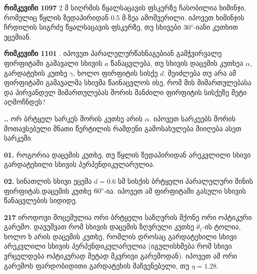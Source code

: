 \documentclass{book}
\begin{document}
\textbf{რიმკევიჩი 1097} 2 მ სიღრმის წყალსაცავის ფსკერზე ჩასობილია ხიმინჯი, რომელიც წყლის ზედაპირიდან 0.5 მ-ზეა ამოშვერილი. იპოვეთ ხიმინჯის ჩრდილის სიგრძე წყალსაცავის ფსკერზე, თუ სხივები $30 \degree$-იანი კუთხით ეცემიან.

\textbf{რიმკევიჩი 1101} . იპოვეთ პარალელურწახნაგებიან გამჭვირვალე ფირფიტაში გამავალი სხივის $a$ წანაცვლება, თუ სხივის დაცემის კუთხეა $\alpha$, გარდატეხის კუთხე $\gamma$, ხოლო ფირფიტის სისქე $d$. მეიძლება თუ არა ამ ფირფიტაში გამავალმა სხივმა წაინაცვლოს ისე, რომ მის მიმართულებასა და პირვანდელ მიმართულებას შორის მანძილი ფირფიტის სისქეზე მეტი აღმოჩნდეს?

\textbf{..} 
ორ ბრტყელ სარკეს შორის კუთხე არის $\alpha$. იპოვეთ სარკეებს შორის მოთავსებული მნათი წერტილის რამდენი გამოსახულება მიიღება ასეთ სარკეში.

\textbf{01.}
როგორია დაცემის კუთხე, თუ წყლის ზედაპირიდან არეკვლილი სხივი გარდატეხილი სხივის პერპენდიკულარულია.

\textbf{02.}
სინათლის სხივი ეცემა $d = 0.6$ სმ სისქის ბრტყელი პარალელური მინის ფირფიტას.დაცემის კუთხე $60 \degree$-ია. იპოვეთ ამ ფირფიტაში გასული სხივის წანაცვლების სიდიდე.

\textbf{217}
იროდოვი 
მოცემულია ორი ბრტყელი საზღვრის მქონე ორი ოპტიკური გარემო. დავუშვათ რომ სხივის დაცემის ზღვრული კუთხე $\theta_1$-ის ტოლია, ხოლო ხ არის დაცემის კუთხე, რომლის დროსაც გარდატეხილი სხივი არეკვლილი სხივის პერპენდიკულარულია (იგულისხმება რომ სხივი ვრცელდება ოპტიკურად მეტად მკვრივი გარემოდან). იპოვეთ ამ ორი გარემოს ფარდობიდითი გარდატეხის მაჩვენებელი, თუ $\eta = 1.28$.
\end{document}
